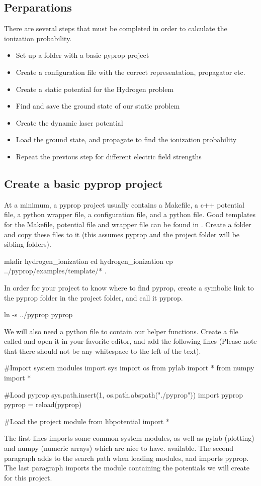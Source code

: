 \subsection{Perparations}
There are several steps that must be completed in order to calculate the ionization probability.
\begin{itemize}
 \item Set up a folder with a basic pyprop project
 \item Create a configuration file with the correct representation, propagator etc.
 \item Create a static potential for the Hydrogen problem
 \item Find and save the ground state of our static problem
 \item Create the dynamic laser potential
 \item Load the ground state, and propagate to find the ionization probability
 \item Repeat the previous step for different electric field strengths
\end{itemize}

\subsection{Create a basic pyprop project}
At a minimum, a pyprop project usually contains a Makefile, a c++ potential file, a python wrapper file, a configuration file, 
and a python file. Good templates for the Makefile, potential file and wrapper file can be found in .
Create a folder and copy these files to it (this assumes pyprop and the project folder will be sibling folders).
\begin{bash}
	mkdir hydrogen_ionization
	cd hydrogen_ionization
	cp ../pyprop/examples/template/* .
\end{bash}
In order for your project to know where to find pyprop, create a symbolic link to the pyprop folder in the project folder, and 
call it pyprop.
\begin{bash}
 	ln -s ../pyprop pyprop
\end{bash}
We will also need a python file to contain our helper functions. Create a file called  and open it in your 
favorite editor, and add the following lines (Please note that there should not be any whitespace to the left of the text).
\begin{python}
	#Import system modules
	import sys
	import os
	from pylab import *
	from numpy import *

	#Load pyprop
	sys.path.insert(1, os.path.abspath("./pyprop"))
	import pyprop
	pyprop = reload(pyprop)

	#Load the project module
	from libpotential import *
\end{python}
The first lines imports some common system modules, as well as pylab (plotting) and numpy (numeric arrays) which are nice to have. 
available. The second paragraph adds  to the search path when loading modules, and imports pyprop. The last paragraph
imports the module containing the potentials we will create for this project.

